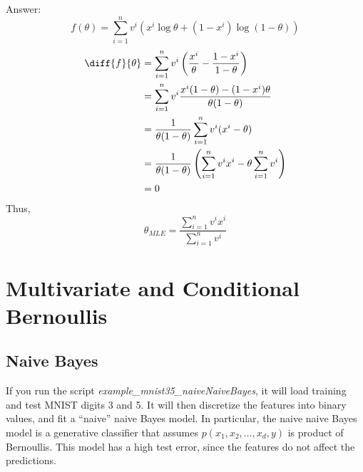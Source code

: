 \documentclass{article}
\def\ans#1{\par\gre{Answer: #1}}
\def\gre#1{{\color{gre}#1}}
\begin{document}
{\ans{
\[f(\theta) = \sum_{i=1}^n v^i (x^i \log\theta + (1-x^i)\log(1-\theta))\]
\begin{equation}
\begin{aligned}
    \diff{f}{\theta}
    &= \sum_{i=1}^n v^i \left(\frac{x^i}{\theta} 
    - \frac{1-x^i}{1-\theta}\right)\\
    &= \sum_{i=1}^n v^i \frac{x^i(1-\theta) - (1-x^i)\theta}
    {\theta(1-\theta)}\\
    &= \frac{1}{\theta(1-\theta)} \sum_{i=1}^n v^i (x^i - \theta)\\
    &= \frac{1}{\theta(1-\theta)} 
    \left(\sum_{i=1}^n v^i x^i - \theta\sum_{i=1}^n v^i\right)\\
    &= 0
\end{aligned}
\end{equation}
Thus,
\[\theta_{MLE} = \frac{\sum_{i=1}^n v^i x^i}{\sum_{i=1}^n v^i}\]
}
}
\pagebreak

\section{Multivariate and Conditional Bernoullis}

\subsection{Naive Bayes}

If you run the script \emph{example\_mnist35\_naiveNaiveBayes}, it will load training and test MNIST digits 3 and 5. It will then discretize the features into binary values, and fit a ``naive'' naive Bayes model. In particular, the naive naive Bayes model is a generative classifier that assumes $p(x_1, x_2,\dots,x_d,y)$ is product of Bernoullis. This model has a high test error, since the features do not affect the predictions.
\end{document}
